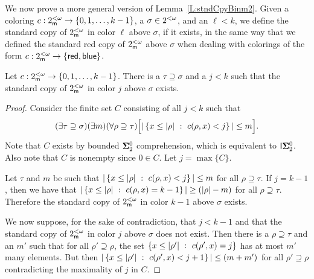 We now prove a more general version of Lemma~\ref{L:stndCpyBinm2}.
Given a coloring $c:2^{<\omega}_{\mathsf{m}}\to\{0,1,\ldots,k-1\}$, a $\sigma\in2^{<\omega}$, and an $\ell<k$,
we define the standard copy of $2^{<\omega}_{\mathsf{m}}$ in color $\ell$ above $\sigma$,
if it exists, in the same way that we defined the standard red copy of
$2^{<\omega}_{\mathsf{m}}$ above $\sigma$ when dealing with colorings of the form $c:2^{<\omega}_{\mathsf{m}}\to\{\mathsf{red},\mathsf{blue}\}$.

\begin{lem}\label{L:stndCpyBinmK}
Let $c:2^{<\omega}_{\mathsf{m}}\to\{0,1,\ldots,k-1\}$.
There is a $\tau\supseteq\sigma$ and a $j<k$
such that the standard copy of $2^{<\omega}_{\mathsf{m}}$ in color $j$ above $\sigma$ exists.
\end{lem}
\begin{proof}
Consider the finite set $C$ consisting of all $j<k$ such that
$$(\exists\tau\supseteq\sigma)(\exists m)(\forall\rho\supseteq\tau)\Big[|\left\{x\leq|\rho|\ :\ c(\rho,x)<j\right\}|\leq m\Big].$$
Note that $C$ exists by bounded $\mathbf{\Sigma}^0_2$ comprehension, which is equivalent to $\mathsf{I}{\mathbf{\Sigma}^0_2}$.
Also note that $C$ is nonempty since $0\in C$.
Let $j=\max\{C\}$.

Let $\tau$ and $m$ be such that $|\left\{x\leq|\rho|\ :\ c(\rho,x)<j\right\}|\leq m$
for all $\rho\supseteq\tau$.
If $j=k-1$, then we have that
$|\left\{x\leq|\rho|\ :\ c(\rho,x)=k-1\right\}|\geq (|\rho|-m)$
for all $\rho\supseteq\tau$.
Therefore the standard copy of $2^{<\omega}_{\mathsf{m}}$ in color $k-1$ above $\sigma$ exists.

We now suppose, for the sake of contradiction, that $j<k-1$ and that the
standard copy of $2^{<\omega}_{\mathsf{m}}$ in color $j$ above $\sigma$ does not exist.
Then there is a $\rho\supseteq\tau$ and an $m'$
such that for all $\rho'\supseteq\rho$, the set $\left\{x\leq|\rho'|\ :\ c(\rho',x)=j\right\}$
has at most $m'$ many elements.
But then $|\left\{x\leq|\rho'|\ :\ c(\rho',x)<j+1\right\}|\leq (m+m')$ for all $\rho'\supseteq\rho$
contradicting the maximality of $j$ in $C$.
\end{proof}

